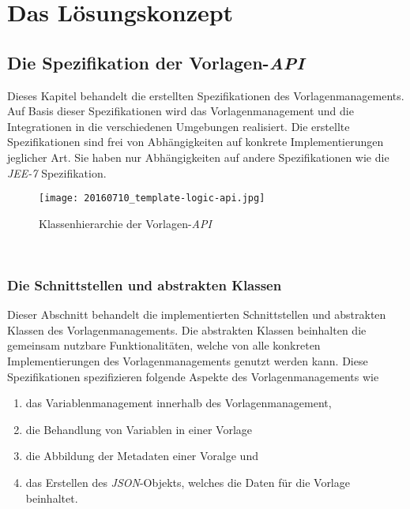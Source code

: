 \chapter{Das Lösungskonzept}
\label{cha:Lösungskonzept}
\section{Die Spezifikation der Vorlagen-\emph{API}}
Dieses Kapitel behandelt die erstellten Spezifikationen des Vorlagenmanagements. Auf Basis dieser Spezifikationen wird das Vorlagenmanagement und die Integrationen in die verschiedenen Umgebungen realisiert. Die erstellte Spezifikationen sind frei von Abhängigkeiten auf konkrete Implementierungen jeglicher Art. Sie haben nur Abhängigkeiten auf andere Spezifikationen wie die \emph{JEE-7} Spezifikation.
\begin{figure}[h]
\centering
\texttt{[image: 20160710\_template-logic-api.jpg]} %
\caption{Klassenhierarchie der Vorlagen-\emph{API}}
\label{fig:template-logic-api-hierarchy}
\end{figure}
\ \newpage

\subsection{Die Schnittstellen und abstrakten Klassen}
Dieser Abschnitt behandelt die implementierten Schnittstellen und abstrakten Klassen des Vorlagenmanagements. Die abstrakten Klassen beinhalten die gemeinsam nutzbare Funktionalitäten, welche von alle konkreten Implementierungen des Vorlagenmanagements genutzt werden kann. Diese Spezifikationen spezifizieren folgende Aspekte des Vorlagenmanagements wie
\begin{enumerate}
	\item das Variablenmanagement innerhalb des Vorlagenmanagement,
	\item die Behandlung von Variablen in einer Vorlage 
	\item die Abbildung der Metadaten einer Voralge und 
	\item das Erstellen des \emph{JSON}-Objekts, welches die Daten für die Vorlage beinhaltet.
\end{enumerate}

